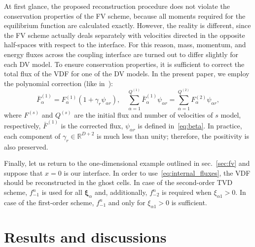\documentclass{article}
\newcommand{\bxi}{{\boldsymbol{\xi}}}
\newcommand{\bxia}{\bxi_\alpha}
\begin{document}
At first glance, the proposed reconstruction procedure does not violate the conservation properties of the FV scheme,
because all moments required for the equilibrium function are calculated exactly.
However, the reality is different, since the FV scheme actually deals separately
with velocities directed in the opposite half-spaces with respect to the interface.
For this reason, mass, momentum, and energy fluxes across the coupling interface
are turned out to differ slightly for each DV model.
To ensure conservation properties, it is sufficient to correct the total flux of the VDF for one of the DV models.
In the present paper, we employ the polynomial correction (like in~\cite{Aristov1980}):
\begin{equation}\label{eq:poly_correction}
    \bar{F}^{(1)}_\alpha = F^{(1)}_\alpha(1+\gamma_r\psi_{\alpha r}), \quad
    \sum_{\alpha=1}^{Q^{(1)}} \bar{F}^{(1)}_\alpha\psi_{\alpha r} = \sum_{\alpha=1}^{Q^{(2)}} F^{(2)}_\alpha\psi_{\alpha r},
\end{equation}
where \(F^{(s)}\) and \(Q^{(s)}\) are the initial flux and number of velocities of \(s\) model, respectively,
\(\bar{F}^{(1)}\) is the corrected flux, \(\psi_{\alpha r}\) is defined in~\eqref{eq:beta}.
In practice, each component of \(\gamma_r\in\mathbb{R}^{D+2}\) is much less than unity;
therefore, the positivity is also preserved.

Finally, let us return to the one-dimensional example outlined in sec.~\ref{sec:fv}
and suppose that \(x=0\) is our interface.
In order to use~\eqref{eq:internal_fluxes}, the VDF should be reconstructed in the ghost cells.
In case of the second-order TVD scheme, \(f_{-1}^n\) is used for all \(\bxia\) and, additionally,
\(f_{-2}^n\) is required when \(\xi_{\alpha1}>0\).
In case of the first-order scheme, \(f_{-1}^n\) and only for \(\xi_{\alpha1}>0\) is sufficient.

\section{Results and discussions}\label{sec:examples}
\end{document}
